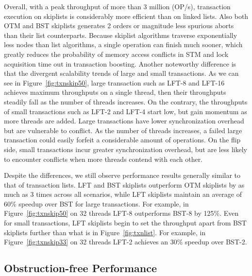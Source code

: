 \documentclass{sig-alternate-05-2015}
\begin{document}
Overall, with a peak throughput of more than 3 million (OP/s), transaction execution on skiplists is considerably more efficient than on linked lists.
Also both OTM and BST skiplists generates 2 orders or magnitude less spurious aborts than their list counterparts.
Because skiplist algorithms traverse exponentially less nodes than list algorithms, a single operation can finish much sooner, which greatly reduces the probability of memory access conflicts in STM and lock acquisition time out in transaction boosting.
Another noteworthy difference is that the divergent scalability trends of large and small transactions. 
As we can see in Figure~\ref{fig:txnskip50}, large transaction such as LFT-8 and LFT-16 achieves maximum throughputs on a single thread, then their throughputs steadily fall as the number of threads increases.
On the contrary, the throughputs of small transactions such as LFT-2 and LFT-4 start low, but gain momentum as more threads are added.
Large transactions have lower synchronization overhead but are vulnerable to conflict.
As the number of threads increases, a failed large transaction could easily forfeit a considerable amount of operations.
On the flip side, small transactions incur greater synchronization overhead, but are less likely to encounter conflicts when more threads contend with each other.

Despite the differences, we still observe performance results generally similar to that of transaction lists.
LFT and BST skiplists outperform OTM skiplists by as much as 3 times across all scenarios, while LFT skiplists maintain an average of 60\% speedup over BST for large transactions.
For example, in Figure~\ref{fig:txnskip50} on 32 threads LFT-8 outperforms BST-8 by 125\%.
Even for small transactions, LFT skiplists begin to set the throughput apart from BST skiplists further than what is in Figure~\ref{fig:txnlist}.
For example, in Figure~\ref{fig:txnskip33} on 32 threads LFT-2 achieves an 30\% speedup over BST-2.

\subsection{Obstruction-free Performance}
\end{document}
